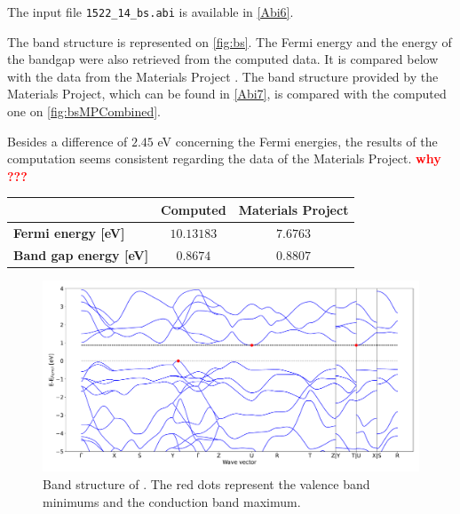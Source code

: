 \documentclass[11pt,a4paper]{article}
\begin{document}
The input file \texttt{1522\_14\_bs.abi} is available in \autoref{Abi6}. 



The band structure is represented on \autoref{fig:bs}. The Fermi energy and the energy of the bandgap were also retrieved from the computed data. It is compared below with the data from the Materials Project \cite{MaterialsProject}. The band structure provided by the Materials Project, which can be found in \autoref{Abi7}, is compared with the computed one on \autoref{fig:bsMPCombined}.

Besides a difference of $2.45$ eV concerning the Fermi energies, the results of the computation seems consistent regarding the data of the Materials Project. \textbf{\textcolor{red}{why ???}}
\begin{center}
\begin{tabular}{|l|c|c|}
\cline{2-3}
\multicolumn{1}{l|}{}&\textbf{Computed}&\textbf{Materials Project}\\
\hline 
\textbf{Fermi energy [eV]}& $10.13183$&$7.6763$\\
\hline
\textbf{Band gap energy [eV]} & $0.8674$ & $0.8807$ \\
\hline
\end{tabular}
\end{center}
\begin{figure}[h]
\centering
\includegraphics[width=\textwidth]{images/bs.pdf}
\caption{Band structure of . The red dots represent the valence band minimums and the conduction band maximum.}
\label{fig:bs}
\end{figure}
\end{document}
